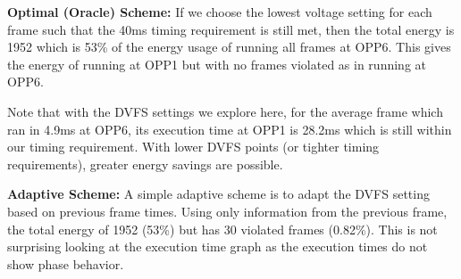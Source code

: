 \documentclass[11pt, letterpaper]{article}
\begin{document}
\textbf{Optimal (Oracle) Scheme: } 
If we choose the lowest voltage setting for each frame such that the 40ms
timing requirement is still met, then the total energy is 1952 which is 53\% of
the energy usage of running all frames at OPP6. This gives the energy of
running at OPP1 but with no frames violated as in running at OPP6.

Note that with the DVFS settings we explore here, for the average frame which
ran in 4.9ms at OPP6, its execution time at OPP1 is 28.2ms which is still
within our timing requirement. With lower DVFS points (or tighter timing
requirements), greater energy savings are possible.

\textbf{Adaptive Scheme: }
A simple adaptive scheme is to adapt the DVFS setting based on previous frame times.
Using only information from the previous frame, the total energy of 1952 (53\%)
but has 30 violated frames (0.82\%). This is not surprising looking at the
execution time graph as the execution times do not show phase behavior.

% 
\end{document}
